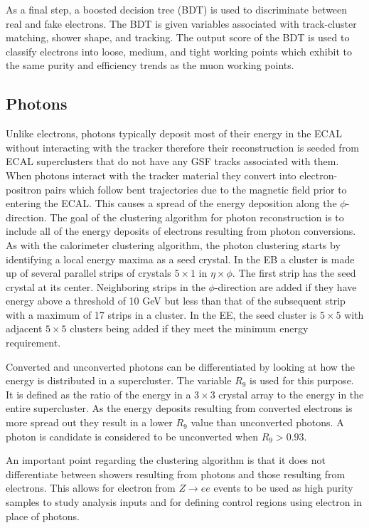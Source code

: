 As a final step, a boosted decision tree (BDT) is used to discriminate between real and fake electrons.  The BDT is given variables associated with track-cluster matching, shower shape, and tracking.  The output score of the BDT is used to classify electrons into loose, medium, and tight working points which exhibit to the same purity and efficiency trends as the muon working points.

\subsection{Photons} 
Unlike electrons, photons typically deposit most of their energy in the ECAL without interacting with the tracker therefore their reconstruction is seeded from ECAL superclusters that do not have any GSF tracks associated with them.  When photons interact with the tracker material they convert into electron-positron pairs which follow bent trajectories due to the magnetic field prior to entering the ECAL.  This causes a spread of the energy deposition along the $\phi$-direction.  The goal of the clustering algorithm for photon reconstruction is to include all of the energy deposits of electrons resulting from photon conversions.  As with the calorimeter clustering algorithm, the photon clustering starts by identifying a local energy maxima as a seed crystal. In the EB a cluster is made up of several parallel strips of crystals $5\times1$ in $\eta \times \phi$.  The first strip has the seed crystal at its center.  Neighboring strips in the $\phi$-direction are added if they have energy above a threshold of 10 GeV but less than that of the subsequent strip with a maximum of 17 strips in a cluster.  In the EE, the seed cluster is $5\times5$ with adjacent $5\times5$ clusters being added if they meet the minimum energy requirement.

Converted and unconverted photons can be differentiated by looking at how the energy is distributed in a supercluster.  The variable $R_9$ is used for this purpose.  It is defined as the ratio of the energy in a $3\times3$ crystal array to the energy in the entire supercluster.  As the energy deposits resulting from converted electrons is more spread out they result in a lower $R_9$ value than unconverted photons.  A photon is candidate is considered to be unconverted when $R_9>0.93$.  

An important point regarding the clustering algorithm is that it does not differentiate between showers resulting from photons and those resulting from electrons.  This allows for electron from $Z\rightarrow ee$ events to be used as high purity samples to study analysis inputs and for defining control regions using electron in place of photons.


